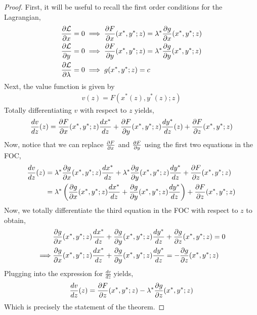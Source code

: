 \begin{proof}
    First, it will be useful to recall the first order conditions for the Lagrangian,
    \begin{align*}
        \frac{\partial \mathcal{L}}{\partial x} = 0 &\implies \frac{\partial F}{\partial x}(x^*, y^*; z) = \lambda^* \frac{\partial g}{\partial x}(x^*, y^*; z) \\
        \frac{\partial \mathcal{L}}{\partial y} = 0 &\implies \frac{\partial F}{\partial y}(x^*, y^*; z) = \lambda^* \frac{\partial g}{\partial y}(x^*, y^*; z) \\
        \frac{\partial \mathcal{L}}{\partial \lambda} = 0 &\implies g(x^*, y^*; z) = c
    \end{align*}
    Next, the value function is given by
    \begin{align*}
        v(z) = F(x^*(z), y^*(z); z) 
    \end{align*}
    Totally differentiating $v$ with respect to $z$ yields,
    \begin{align*}
        \frac{dv}{dz}(z) = \frac{\partial F}{\partial x}(x^*, y^*; z) \frac{dx^*}{dz} + \frac{\partial F}{\partial y}(x^*, y^*; z) \frac{dy^*}{dz}(z) + \frac{\partial F}{\partial z}(x^*, y^*; z)
    \end{align*}
    Now, notice that we can replace $\frac{\partial F}{\partial x}$ and $\frac{\partial F}{\partial y}$ using the first two equations in the FOC,
    \begin{align*}
        \frac{dv}{dz}(z) &= \lambda^* \frac{\partial g}{\partial x}(x^*, y^*; z)  \frac{dx^*}{dz} + \lambda^* \frac{\partial g}{\partial y}(x^*, y^*; z) \frac{dy^*}{dz} + \frac{\partial F}{\partial z}(x^*, y^*; z) \\
        &= \lambda^* \left(\frac{\partial g}{\partial x}(x^*, y^*; z) \frac{dx^*}{dz} + \frac{\partial g}{\partial y}(x^*, y^*; z) \frac{dy^*}{dz}\right) + \frac{\partial F}{\partial z}(x^*, y^*; z)
    \end{align*}
    Now, we totally differentiate the third equation in the FOC with respect to $z$ to obtain,
    \begin{align*}
        &\frac{\partial g}{\partial x}(x^*, y^*; z) \frac{dx^*}{dz} + \frac{\partial g}{\partial y}(x^*, y^*; z) \frac{dy^*}{dz} + \frac{\partial g}{\partial z}(x^*, y^*; z) = 0 \\
        \implies& \frac{\partial g}{\partial x}(x^*, y^*; z) \frac{dx^*}{dz} + \frac{\partial g}{\partial y}(x^*, y^*; z) \frac{dy^*}{dz} = - \frac{\partial g}{\partial z}(x^*, y^*; z)
    \end{align*}
    Plugging into the expression for $\frac{dv}{dz}$ yields,
    \begin{align*}
        \frac{dv}{dz}(z) = \frac{\partial F}{\partial z}(x^*, y^*; z) - \lambda^* \frac{\partial g}{\partial z}(x^*, y^*; z)
    \end{align*}
    Which is precisely the statement of the theorem.
\end{proof}

